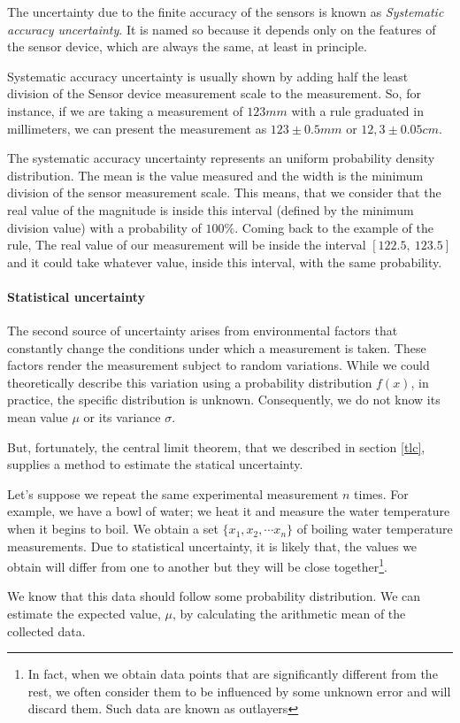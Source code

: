 \begin{paracol}{2}
The uncertainty due to the finite accuracy of the sensors is known as \emph{Systematic accuracy uncertainty}. It is named so because it depends only on the features of the sensor device, which are always the same, at least in principle. 

Systematic accuracy uncertainty is usually shown by adding half the least division of the Sensor device measurement scale to the measurement. So, for instance, if we are taking a measurement of $123 mm$ with a rule graduated in millimeters, we can present the measurement as  $123 \pm 0.5 mm$ or $12,3\pm0.05cm$.

The systematic accuracy uncertainty represents an uniform probability density distribution. The mean is the value measured and the width is the minimum division of the sensor measurement scale. This means, that we consider that the real value of the magnitude is inside this interval (defined by the minimum division value) with a probability of $100\%$. Coming back to the example of the rule, The real value of our measurement will be inside the interval $[122.5,\ 123.5 ]$ and it could take whatever value, inside this interval, with the same probability. 

\paragraph{Statistical uncertainty}
The second source of uncertainty arises from environmental factors that constantly change the conditions under which a measurement is taken. These factors render the measurement subject to random variations. While we could theoretically describe this variation using a probability distribution $f(x)$, in practice, the specific distribution is unknown. Consequently, we do not know its mean value $\mu$ or its variance $\sigma$.

But, fortunately, the central limit theorem, that we described in section \ref{tlc}, supplies a method to estimate the statical uncertainty.

Let's suppose we repeat the same experimental measurement $n$ times. For example, we have a bowl of water; we heat it and measure the water temperature when it begins to boil. We obtain a set $\{x_1,x_2,\cdots x_n\}$ of boiling water temperature measurements. Due to statistical uncertainty, it is likely that,  the values we obtain will differ from one to another but they will be close together\footnote{In fact, when we obtain data points that are significantly different from the rest, we often consider them to be influenced by some unknown error and will discard them. Such data are known as outlayers}.

We know that this data should follow some probability distribution. We can estimate the expected value, $\mu$, by calculating the arithmetic mean of the collected data.
\end{paracol}


